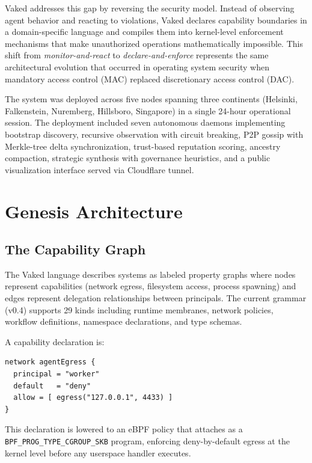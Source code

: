 \documentclass[conference]{IEEEtran}
\begin{document}
Vaked addresses this gap by reversing the security model. Instead of observing
agent behavior and reacting to violations, Vaked declares capability boundaries
in a domain-specific language and compiles them into kernel-level enforcement
mechanisms that make unauthorized operations mathematically impossible. This
shift from \textit{monitor-and-react} to \textit{declare-and-enforce} represents
the same architectural evolution that occurred in operating system security when
mandatory access control (MAC) replaced discretionary access control (DAC).

The system was deployed across five nodes spanning three continents (Helsinki,
Falkenstein, Nuremberg, Hillsboro, Singapore) in a single 24-hour operational
session. The deployment included seven autonomous daemons implementing bootstrap
discovery, recursive observation with circuit breaking, P2P gossip with Merkle-tree
delta synchronization, trust-based reputation scoring, ancestry compaction,
strategic synthesis with governance heuristics, and a public visualization
interface served via Cloudflare tunnel.

\section{Genesis Architecture}

\subsection{The Capability Graph}

The Vaked language describes systems as labeled property graphs where nodes
represent capabilities (network egress, filesystem access, process spawning)
and edges represent delegation relationships between principals. The current
grammar (v0.4) supports 29 kinds including runtime membranes, network policies,
workflow definitions, namespace declarations, and type schemas.

A capability declaration is:

\begin{lstlisting}[basicstyle=\ttfamily\scriptsize,breaklines=true]
network agentEgress {
  principal = "worker"
  default   = "deny"
  allow = [ egress("127.0.0.1", 4433) ]
}
\end{lstlisting}

This declaration is lowered to an eBPF policy that attaches as a
\texttt{BPF\_PROG\_TYPE\_CGROUP\_SKB} program, enforcing deny-by-default
egress at the kernel level before any userspace handler executes.
\end{document}
